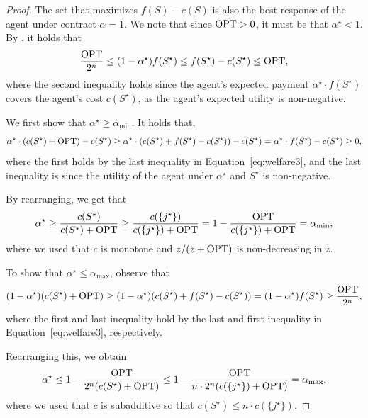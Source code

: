 \documentclass[11pt]{article}
\begin{document}
\begin{proof}
The set that maximizes $f(S)-c(S)$ is also the best response of the agent under contract $\alpha=1$.
We note that since $\text{OPT}>0$, it must be that $\alpha^\star <1 $.
By , it holds that 
\begin{equation}
    \frac{\text{OPT}}{2^n}\leq (1-\alpha^\star)  f(S^\star)   \leq   f(S^\star) -c(S^\star) \leq \text{OPT},\label{eq:welfare3}
\end{equation}
where the second inequality holds since the agent's expected payment $\alpha^\star \cdot f(S^\star)$ covers the agent's cost $c(S^\star)$,  as the agent's expected utility is non-negative.

We first show that $\alpha^\star \geq \alpha_{\min}$. It holds that, 
$$
\alpha^\star \cdot (  c(S^\star) + \text{OPT}  )-c(S^\star) \geq \alpha^\star \cdot (  c(S^\star) + f(S^\star)-c(S^\star) )-c(S^\star) =  \alpha^\star \cdot f(S^\star) -c(S^\star) \geq 0, 
$$
where the first holds by the last inequality in  Equation~\eqref{eq:welfare3}, and the last inequality is since the utility of the agent under $\alpha^\star$ and $S^\star$ is non-negative.

By rearranging, we get that 
$$
\alpha^\star \geq \frac{c(S^\star)}{ c(S^\star) + \text{OPT}} \geq \frac{c(\{j^\star\})}{c(\{j^\star\}) +\text{OPT} } = 1- \frac{\text{OPT}}{ c(\{j^\star\}) + \text{OPT}} = \alpha_{\min},
$$
where we used that $c$ is monotone and $z/(z+\text{OPT})$ is non-decreasing in $z$. 

To show that $\alpha^\star \leq \alpha_{\max}$, observe that 
$$ (1-\alpha^\star) (c(S^\star) + \text{OPT}) \geq   (1-\alpha^\star) (c(S^\star) + f(S^\star) - c(S^\star)) =  (1-\alpha^\star) f(S^\star) \geq  \frac{\text{OPT}}{2^n},  $$
where the first and last inequality hold by the last and first inequality in Equation~\ref{eq:welfare3}, respectively.

Rearranging this, we obtain
$$  \alpha^\star \leq 1- \frac{\text{OPT}}{2^n (c(S^\star) + \text{OPT} )} \leq 1- \frac{\text{OPT}}{n\cdot 2^n (c(\{j^\star\}) + \text{OPT} )}  = \alpha_{\max},$$
where we used that $c$ is subadditive so that $c(S^\star) \leq n \cdot c(\{j^\star\})$. 
\end{proof}
\end{document}

